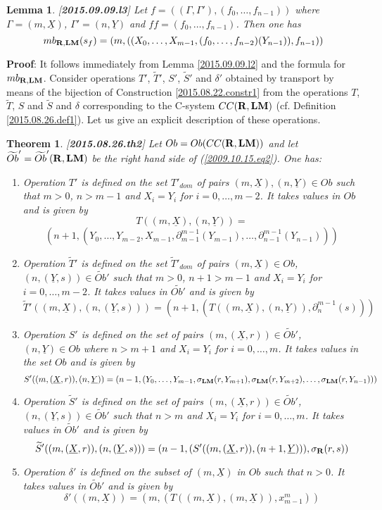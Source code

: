 \documentclass[11pt]{article}
\newenvironment{proof}{{\bf Proof}:}{\vskip 5mm }
\newtheorem{lemma}[proposition]{Lemma}
\newtheorem{theorem}[proposition]{Theorem}
\newcommand{\llabel}[1]{\label{#1}[{\bf #1}]}
\newcommand{\rr}{{\bf R}}
\newcommand{\lm}{{\bf LM}}
\newcommand{\uu}{\underline}
\newcommand{\wt}{\widetilde}
\begin{document}
%
\begin{lemma}
\llabel{2015.09.09.l3}
Let $f=((\Gamma,\Gamma'),(f_0,\dots,f_{n-1}))$ where $\Gamma=(m,\uu{X})$, $\Gamma'=(n,\uu{Y})$ and $ff=(f_0,\dots,f_{n-1})$. Then one has
%
$$mb_{\rr,\lm}(s_f)=(m,((X_0,\dots,X_{m-1},(f_0,\dots,f_{n-2})(Y_{n-1})), f_{n-1}))$$
%
\end{lemma}
%
\begin{proof}
It follows immediately from Lemma \ref{2015.09.09.l2} and the formula for $mb_{\rr,\lm}$.
\end{proof}
%
Consider operations $T'$, $\wt{T}'$, $S'$, $\wt{S}'$ and $\delta'$ obtained by transport by means of the bijection of Construction \ref{2015.08.22.constr1} from the operations $T$, $\wt{T}$, $S$ and $\wt{S}$ and $\delta$ corresponding to the C-system $CC(\rr,\lm)$ (cf. Definition \ref{2015.08.26.def1}).  Let us give an explicit description of these operations. 
%
\begin{theorem}\llabel{2015.08.26.th2}
Let $Ob=Ob(CC(\rr,\lm))$ and let $\wt{Ob}'=\wt{Ob}'(\rr,\lm)$ be the right hand side of (\ref{2009.10.15.eq2}). One has:
%
\begin{enumerate}
\item Operation $T'$ is defined on the set $T'_{dom}$ of pairs $(m,\uu{X}),(n,\uu{Y})\in Ob$ such that $m>0$, $n>m-1$ and $X_i=Y_i$ for $i=0,\dots,m-2$. It takes values in $Ob$ and is given by 
%
$$T((m,\uu{X}),(n,\uu{Y}))=$$$$(n+1,(Y_0,\dots,Y_{m-2},X_{m-1},\partial_{m-1}^{m-1}(Y_{m-1}),\dots,\partial_{n-1}^{m-1}(Y_{n-1})))$$
%
\item Operation $\wt{T}'$ is defined on the set $\wt{T}'_{dom}$ of pairs $(m,\uu{X})\in Ob$, $(n,(\uu{Y},s))\in\wt{Ob}'$ such that $m>0$, $n+1>m-1$ and $X_i=Y_i$ for $i=0,\dots,m-2$. It takes values in $\wt{Ob'}$ and is given by
%
$$\wt{T}'((m,\uu{X}),(n,(\uu{Y},s)))=(n+1,(T((m,\uu{X}),(n,\uu{Y})),\partial_{n}^{m-1}(s)))$$
%
\item Operation $S'$ is defined on the set of pairs $(m,(\uu{X},r))\in \wt{Ob}'$, $(n,\uu{Y})\in Ob$ where $n>m+1$ and $X_i=Y_i$ for $i=0,\dots,m$. It takes values in the set $Ob$ and is given by 
%
$$S'((m,(\uu{X},r)),(n,\uu{Y}))=(n-1,(Y_0,\dots,Y_{m-1},\sigma_{\lm}(r,Y_{m+1}),\sigma_{\lm}(r,Y_{m+2}),\dots,\sigma_{\lm}(r,Y_{n-1})))$$
%
\item Operation $\wt{S}'$ is defined on the set of pairs $(m,(\uu{X},r))\in \wt{Ob}'$, $(n,(\uu{Y},s))\in \wt{Ob}'$ such that $n>m$ and $X_i=Y_i$ for $i=0,\dots,m$. It takes values in $\wt{Ob}'$ and is given by 
%
$$\wt{S}'((m,(\uu{X},r)),(n,(\uu{Y},s)))=(n-1,(S'((m,(\uu{X},r)),(n+1,\uu{Y}))),\sigma_{\rr}(r,s))$$
%
\item Operation $\delta'$ is defined on the subset of $(m,\uu{X})$ in $Ob$ such that $n>0$. It takes values in $\wt{Ob}'$ and is given by 
%
$$\delta'((m,\uu{X}))=(m,(T((m,\uu{X}),(m,\uu{X})),x_{m-1}^m))$$
%
\end{enumerate}
\end{theorem}
\end{document}
